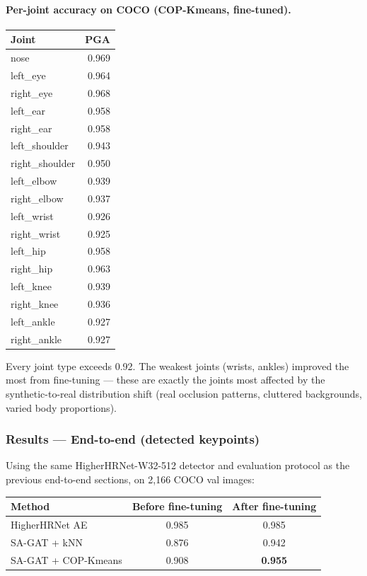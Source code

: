 \paragraph{Per-joint accuracy on COCO (COP-Kmeans, fine-tuned).}

\begin{tabular}{lr}
\hline
\textbf{Joint} & \textbf{PGA} \\
\hline
nose & 0.969 \\
left\_eye & 0.964 \\
right\_eye & 0.968 \\
left\_ear & 0.958 \\
right\_ear & 0.958 \\
left\_shoulder & 0.943 \\
right\_shoulder & 0.950 \\
left\_elbow & 0.939 \\
right\_elbow & 0.937 \\
left\_wrist & 0.926 \\
right\_wrist & 0.925 \\
left\_hip & 0.958 \\
right\_hip & 0.963 \\
left\_knee & 0.939 \\
right\_knee & 0.936 \\
left\_ankle & 0.927 \\
right\_ankle & 0.927 \\
\hline
\end{tabular}

\vspace{0.5em}

Every joint type exceeds 0.92. The weakest joints (wrists, ankles) improved the most from fine-tuning --- these are exactly the joints most affected by the synthetic-to-real distribution shift (real occlusion patterns, cluttered backgrounds, varied body proportions).

\subsubsection{Results --- End-to-end (detected keypoints)}

Using the same HigherHRNet-W32-512 detector and evaluation protocol as the previous end-to-end sections, on 2,166 COCO val images:

\begin{tabular}{lcc}
\hline
\textbf{Method} & \textbf{Before fine-tuning} & \textbf{After fine-tuning} \\
\hline
HigherHRNet AE & 0.985 & 0.985 \\
SA-GAT + kNN & 0.876 & 0.942 \\
SA-GAT + COP-Kmeans & 0.908 & \textbf{0.955} \\
\hline
\end{tabular}

